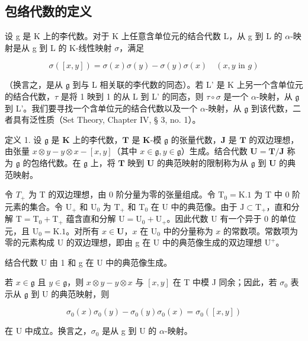 \subsection{包络代数的定义}

设 g 是 K 上的李代数。对于 K 上任意含单位元的结合代数 L，从 g 到 L 的 \(\alpha\)-映射是从 g 到 L 的 K-线性映射 \(\sigma\)，满足

\[
\sigma ([ x, y ]) = \sigma (x) \sigma (y) - \sigma (y) \sigma (x) \quad (x, y \text {   in   } g)
\]

（换言之，是从 \(\mathfrak{g}\) 到与 L 相关联的李代数的同态）。若 L' 是 K 上另一个含单位元的结合代数，\(\tau\) 是将 1 映到 1 的从 L 到 L' 的同态，则 \(\tau \circ \sigma\) 是一个 \(\alpha\)-映射，从 \(\mathfrak{g}\) 到 L'。我们要寻找一个含单位元的结合代数以及一个 \(\alpha\)-映射，从 \(\mathfrak{g}\) 到该代数，二者具有泛性质（Set Theory, Chapter IV, § 3, no. 1）。

定义 1. 设 \(\mathfrak{g}\) 是 \(\mathbf{K}\) 上的李代数，\(\mathbf{T}\) 是 \(\mathbf{K}\)-模 \(\mathfrak{g}\) 的张量代数，\(\mathbf{J}\) 是 \(\mathbf{T}\) 的双边理想，由张量 \(x \otimes y - y \otimes x - [x, y]\)（其中 \(x \in \mathfrak{g}, y \in \mathfrak{g}\)）生成。结合代数 \(\mathbf{U} = \mathbf{T} / \mathbf{J}\) 称为 \(\mathfrak{g}\) 的包络代数。在 \(\mathfrak{g}\) 上，将 \(\mathbf{T}\) 映到 \(\mathbf{U}\) 的典范映射的限制称为从 \(\mathfrak{g}\) 到 \(\mathbf{U}\) 的典范映射。

令 \(T_{+}\) 为 T 的双边理想，由 0 阶分量为零的张量组成。令 \(\mathrm{T}_0 = \mathrm{K}.1\) 为 T 中 0 阶元素的集合。令 \(\mathrm{U}_{+}\) 和 \(\mathrm{U}_0\) 为 \(\mathrm{T}_{+}\) 和 \(\mathrm{T}_0\) 在 U 中的典范像。由于 \(\mathrm{J} \subset \mathrm{T}_{+}\)，直和分解 \(\mathrm{T} = \mathrm{T}_0 + \mathrm{T}_{+}\) 蕴含直和分解 \(\mathrm{U} = \mathrm{U}_0 + \mathrm{U}_{+}\)。因此代数 U 有一个异于 0 的单位元，且 \(\mathrm{U}_0 = \mathrm{K}.1\)。对所有 \(x \in \mathbf{U}\)，\(x\) 在 \(\mathrm{U}_0\) 中的分量称为 \(x\) 的常数项。常数项为零的元素构成 U 的双边理想，即由 g 在 U 中的典范像生成的双边理想 \(\mathrm{U}^{+}\)。

结合代数 U 由 1 和 g 在 U 中的典范像生成。

若 \(x \in \mathfrak{g}\) 且 \(y \in \mathfrak{g}\)，则 \(x \otimes y - y \otimes x\) 与 \([x, y]\) 在 T 中模 J 同余；因此，若 \(\sigma_0\) 表示从 \(\mathfrak{g}\) 到 U 的典范映射，则

\[
\sigma_ {0} (x) \sigma_ {0} (y) - \sigma_ {0} (y) \sigma_ {0} (x) = \sigma_ {0} ([ x, y ])
\]

在 U 中成立。换言之，\(\sigma_{0}\) 是从 g 到 U 的 \(\alpha\)-映射。

